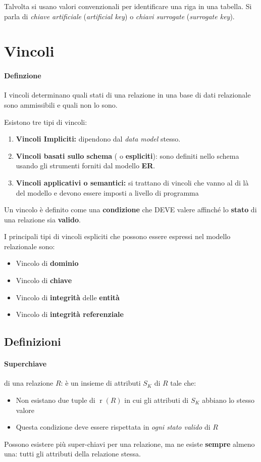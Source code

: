         Talvolta si usano valori convenzionali per identificare una riga in una tabella. Si parla di \textit{chiave artificiale} (\textit{artificial key}) o \textit{chiavi surrogate} (\textit{surrogate key}).
\section{Vincoli}
    \paragraph{Definzione} I vincoli determinano quali stati di una relazione in una base di dati relazionale sono ammissibili e quali non lo sono.
    
    Esistono tre tipi di vincoli:
    \begin{enumerate}
        \item \textbf{Vincoli Impliciti:} dipendono dal \textit{data model} stesso.
        \item \textbf{Vincoli basati sullo schema } ( o \textbf{espliciti}): sono definiti nello schema usando gli strumenti forniti dal modello \textbf{ER}.
        \item \textbf{Vincoli applicativi o semantici:} si trattano di vincoli che vanno al di là del modello e devono essere imposti a livello di programma
    \end{enumerate}
    Un vincolo è definito come una \textbf{condizione} che DEVE valere affinché lo \textbf{stato} di una relazione sia \textbf{valido}. 

    I principali tipi di vincoli espliciti che possono essere espressi nel modello relazionale sono:
    \begin{itemize}
        \item Vincolo di \textbf{dominio}
        \item Vincolo di \textbf{chiave}
        \item Vincolo di \textbf{integrità} delle \textbf{entità}
        \item Vincolo di \textbf{integrità referenziale}
    \end{itemize}
    \subsection{Definizioni}
        \paragraph{Superchiave} di una relazione $ R $: è un insieme di attributi $ S_K $ di $ R $ tale che:
            \begin{itemize}
                \item Non esistano due tuple di $ \operatorname{r}(R) $ in cui gli attributi di $ S_K $ abbiano lo stesso valore
                \item Questa condizione deve essere rispettata in \textit{ogni stato valido} di $ R $
            \end{itemize}
            Possono esistere più super-chiavi per una relazione, ma ne esiste \textbf{sempre} almeno una: tutti gli attributi della relazione stessa.
